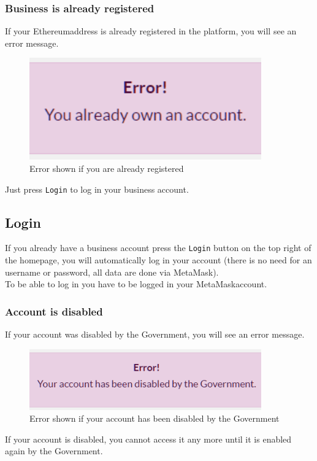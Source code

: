 		\subsubsection{Business is already registered}
		If your Ethereum\glosp address is already registered in the platform, you will 
		see an error message.
		\begin{figure}[H]
			\includegraphics[width=10cm]{res/images/user_already_registered.png}
			\centering
			\caption{Error shown if you are already registered}
		\end{figure}
		\noindent Just press \texttt{Login} to log in your business account.
	\subsection{Login}
	If you already have a business account press the \texttt{Login} button on the 
	top right of the homepage, you will automatically log in your account 
	(there is no need for an username or password, all data are done via MetaMask). 
	\\To be able to log in you have to be logged in your MetaMask\glosp account.
		\subsubsection{Account is disabled}
		If your account was disabled by the Government, you will see an error 
		message.
		\begin{figure}[H]
			\includegraphics[width=10cm]{res/images/user_disabled.png}
			\centering
			\caption{Error shown if your account has been disabled by the Government}
		\end{figure}
	\noindent If your account is disabled, you cannot access it any more until it 
	is enabled again by the Government.

